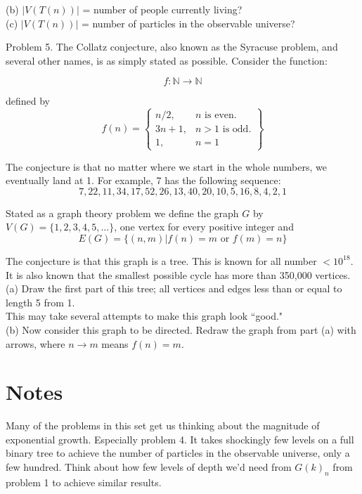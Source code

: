 \documentclass[16 pt]{amsart}
\theoremstyle{definition}
\theoremstyle{remark}
\numberwithin{equation}{subsection}
\begin{document}
(b) $|V(T(n))|$ = number of people currently living?\\

(c) $|V(T(n))|$ = number of particles in the observable universe?

\newpage

Problem 5.  The Collatz conjecture, also known as the Syracuse problem, and several other names, is as simply stated as possible.  Consider the function:

\[
f: \mathbb{N}\rightarrow\mathbb{N}
\]


defined by
\[
f(n) = \left\{\begin{array}{cc}
n/2, & n \text{ is even.}\\
3n+1, & n>1 \text{ is odd.}\\
1, & n=1
\end{array} \right\}
\]

The conjecture is that no matter where we start in the whole numbers, we eventually land at 1.  For example, 7 has the following sequence:
\[
7,22,11,34,17,52,26,13,40,20,10,5,16,8,4,2,1
\]

Stated as a graph theory problem we define the graph $G$ by $V(G)=\{1,2,3,4,5,\dots\}$, one vertex for every positive integer and 
\[
E(G) = \{(n,m)| f(n)=m \text{ or } f(m)=n\}
\]

The conjecture is that this graph is a tree. This is known for all number $<10^{18}$.  It is also known that the smallest possible cycle has more than 350,000 vertices.\\

(a) Draw the first part of this tree; all vertices and edges less than or equal to length 5 from 1. \\
This may take several attempts to make this graph look ``good."\\


(b) Now consider this graph to be directed.  Redraw the graph from part (a) with arrows, where $n\rightarrow m$ means $f(n)=m$.



\newpage

\section{Notes} Many of the problems in this set get us thinking about the magnitude of exponential growth.  Especially problem 4.  It takes shockingly few levels on a full binary tree to achieve the number of particles in the observable universe, only a few hundred.  Think about how few levels of depth we'd need from $G(k)_n$ from problem 1 to achieve similar results.
\end{document}
